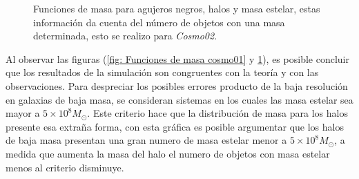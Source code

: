  \begin{figure}
 \centering
 \caption{Funciones de masa para agujeros negros, halos y masa estelar, estas información da cuenta del número de objetos con una masa determinada, esto se realizo para {\it{Cosmo02}}.}
 \label{fig: Funciones de masa cosmo02}
\end{figure}
%
Al observar las figuras (\ref{fig: Funciones de masa cosmo01} y \ref{fig: Funciones de masa cosmo02}), es posible concluir que los resultados de la simulación son congruentes con la teoría y con las observaciones. Para despreciar los posibles errores producto de la baja resolución en galaxias de baja masa, se consideran sistemas en los cuales las masa estelar sea mayor a $5\times 10^{8}M_{\odot}$. Este criterio hace que la distribución de masa para los halos presente  esa extraña forma, con esta gráfica es posible argumentar que los halos de baja masa presentan una gran numero de masa estelar menor a $5\times 10^{8}M_{\odot}$, a medida que aumenta la masa del halo el numero de objetos con masa estelar menos al criterio disminuye. 

